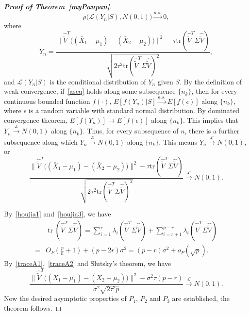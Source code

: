 \documentclass[review]{elsarticle}
\DeclareMathOperator{\mytr}{tr}
\theoremstyle{plain}
\theoremstyle{definition}
\theoremstyle{remark}
\begin{document}
\begin{proof}[\textbf{Proof of Theorem~\ref{myPanpan}}]
\begin{equation}
    \rho\big(\mathcal{L}( Y_n |S),N(0,1)\big)\xrightarrow{a.s.}0,
\end{equation}
where 
$$
Y_n=\frac{\|\hat{\tilde{V}}^T\big((\bar{X}_1-\mu_1)-(\bar{X}_2-\mu_2)\big)\|^2-\tau\mathrm{tr}(\hat{\tilde{V}}^T\Sigma\hat{\tilde{V}})}{\sqrt{2\tau^2\mathrm{tr}(\hat{\tilde{V}}^T\Sigma\hat{\tilde{V}})^2}},
$$
and $\mathcal{L}(Y_n|S)$ is the conditional distribution of $Y_n$ given $S$.
By the definition of weak convergence,  if~\eqref{aseq} holds along some subsequence $\{n_k\}$, then for every continuous bounded function $f(\cdot)$, $E[f(Y_n)|S]\xrightarrow{a.s.}E[f(\epsilon)]$ along $\{n_k\}$, where $\epsilon$ is a random variable with standard normal distribution.
By dominated convergence theorem, $E[f(Y_n)]\to E[f(\epsilon)]$ along $\{n_k\}$.
This implies that $Y_n\xrightarrow{\mathcal{L}}N(0,1)$ along $\{n_k\}$.
Thus, for every subsequence of $n$, there is a further subsequence along which
$Y_n\xrightarrow{\mathcal{L}}N(0,1)$ along $\{n_k\}$.
This means $Y_n\xrightarrow{\mathcal{L}}N(0,1)$, or
$$
\frac{\|\hat{\tilde{V}}^T\big((\bar{X}_1-\mu_1)-(\bar{X}_2-\mu_2)\big)\|^2-\tau\mathrm{tr}(\hat{\tilde{V}}^T\Sigma\hat{\tilde{V}})}{\sqrt{2\tau^2\mathrm{tr}(\hat{\tilde{V}}^T\Sigma\hat{\tilde{V}})^2}}\xrightarrow{\mathcal{L}}N(0,1).
$$


By~\eqref{houjia1} and~\eqref{houjia3}, we have
\begin{equation}\label{traceA2}
    \begin{aligned}
        &\mytr(\hat{\tilde{V}}^T\Sigma\hat{\tilde{V}})=
    \sum_{i=1}^r \lambda_i(\hat{\tilde{V}}^T\Sigma\hat{\tilde{V}})
    +
    \sum_{i=r+1}^{p-r} \lambda_i(\hat{\tilde{V}}^T\Sigma\hat{\tilde{V}})\\
        =&
    O_P(\frac{p}{n}+1)+(p-2r)\sigma^2
        =
        (p-r)\sigma^2+o_P(\sqrt{p}).
    \end{aligned}
\end{equation}
By~\eqref{traceA1},~\eqref{traceA2} and Slutsky's theorem, we have
$$
\frac{\|\hat{\tilde{V}}^T\big((\bar{X}_1-\mu_1)-(\bar{X}_2-\mu_2)\big)\|^2-\sigma^2\tau(p-r) }{\sigma^2\sqrt{2\tau^2 p}}\xrightarrow{\mathcal{L}}N(0,1).
$$
Now the desired asymptotic properties of $P_1$, $P_2$ and $P_3$ are established, the theorem follows.
\end{proof}
\end{document}
